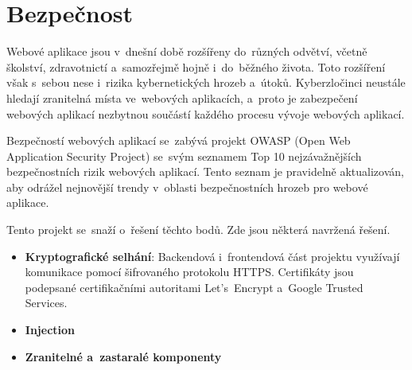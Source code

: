 \chapter{Bezpečnost}
Webové aplikace jsou v~dnešní době rozšířeny do~různých odvětví, včetně školství, zdravotnictí a~samozřejmě hojně i~do~běžného života. Toto rozšíření však s~sebou nese i~rizika kybernetických hrozeb a~útoků. Kyberzločinci neustále hledají zranitelná místa ve~webových aplikacích, a~proto je zabezpečení webových aplikací nezbytnou součástí každého procesu vývoje webových aplikací. \par
Bezpečností webových aplikací se~zabývá projekt OWASP \cite{owasp}(Open Web Application Security Project) se~svým seznamem Top 10 nejzávažnějších \cite{owasp10} bezpečnostních rizik webových aplikací. Tento seznam je pravidelně aktualizován, aby odrážel nejnovější trendy v~oblasti bezpečnostních hrozeb pro webové aplikace.\par
Tento projekt se~snaží o~řešení těchto bodů. Zde jsou některá navržená řešení.\par

\begin{itemize}
    \item \textbf{Kryptografické selhání}\cite{crypto}: Backendová i~frontendová část projektu využívají komunikace pomocí šifrovaného protokolu HTTPS. Certifikáty jsou podepsané certifikačními autoritami Let's~Encrypt a~Google Trusted Services.
    \item \textbf{Injection}
    \item \textbf{Zranitelné a~zastaralé komponenty}
\end{itemize}